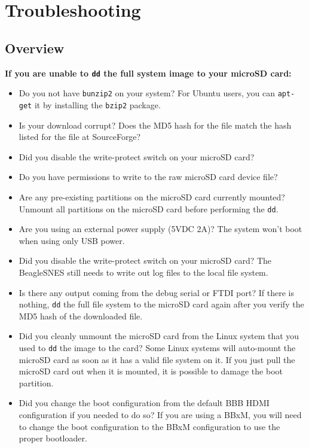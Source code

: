 \chapter{Troubleshooting}

\section{Overview}

{\bf If you are unable to \texttt{dd} the full system image to your microSD card:}
\begin{itemize}
\item Do you not have \texttt{bunzip2} on your system?  For Ubuntu users, you can \texttt{apt-get} it by installing the \texttt{bzip2} package.
\item Is your download corrupt?  Does the MD5 hash for the file match the hash listed for the file at SourceForge? 
\item Did you disable the write-protect switch on your microSD card?
\item Do you have permissions to write to the raw microSD card device file?
\item Are any pre-existing partitions on the microSD card currently mounted?  Unmount all partitions on the microSD card before performing the \texttt{dd}. 
\end{itemize}


\begin{itemize}
\item Are you using an external power supply (5VDC 2A)?  The system won't boot when using only USB power.
\item Did you disable the write-protect switch on your microSD card?  The BeagleSNES still needs to write out log files to the local file system.
\item Is there any output coming from the debug serial or FTDI port? If there is nothing, \texttt{dd} the full file system to the microSD card again after you verify the MD5 hash of the downloaded file.
\item Did you cleanly unmount the microSD card from the Linux system that you used to \texttt{dd} the image to the card? Some Linux systems will auto-mount the microSD card as soon as it has a valid file system on it.  If you just pull the microSD card out when it is mounted, it is possible to damage the boot partition.
\item Did you change the boot configuration from the default BBB HDMI configuration if you needed to do so?  If you are using a BBxM, you will need to change the boot configuration to the BBxM configuration to use the proper bootloader.
\end{itemize}

